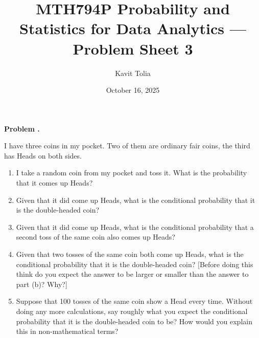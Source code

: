 \documentclass[11pt]{article}
\title{MTH794P Probability and Statistics for Data Analytics — Problem Sheet 3}
\author{Kavit Tolia}
\date{October 16, 2025}
\newcounter{problem}
\newenvironment{problem}[1][]{%
  \refstepcounter{problem}%
  \bigskip\noindent\textbf{Problem \theproblem. #1}\par\smallskip\noindent
}{\bigskip}
\begin{document}
\maketitle

\pagestyle{fancy}
\fancyhf{}%


\begin{problem}
I have three coins in my pocket. Two of them are ordinary fair coins, the third 
has Heads on both sides.
\begin{enumerate}
      \item I take a random coin from my pocket and toss it. What is the probability 
            that it comes up Heads?
      \item Given that it did come up Heads, what is the conditional probability 
            that it is the double-headed coin?
      \item Given that it did come up Heads, what is the conditional probability 
            that a second toss of the same coin also comes up Heads?
      \item Given that two tosses of the same coin both come up Heads, what is 
            the conditional probability that it is the double-headed coin? [Before 
            doing this think do you expect the answer to be larger or smaller than 
            the answer to part (b)? Why?]
      \item Suppose that 100 tosses of the same coin show a Head every time. 
            Without doing any more calculations, say roughly what you expect the 
            conditional probability that it is the double-headed coin to be? How 
            would you explain this in non-mathematical terms?
\end{enumerate}
\end{problem}
\end{document}
